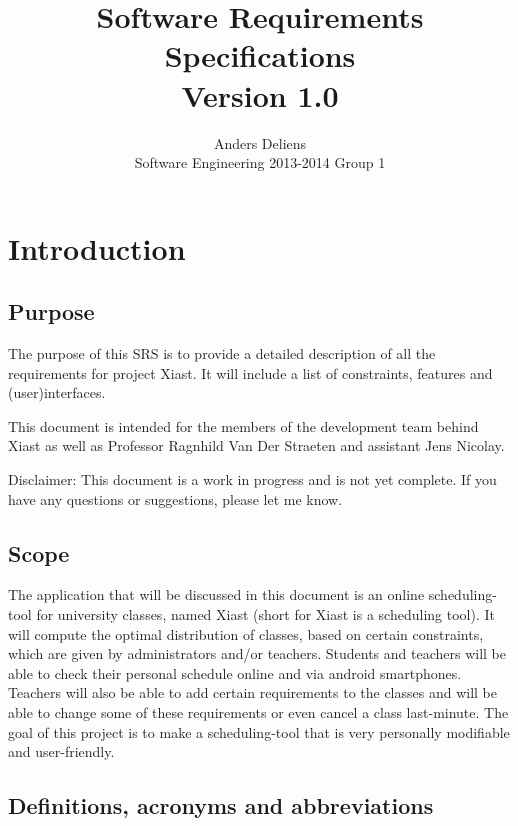 \documentclass[9pt]{article}
\title{Software Requirements Specifications\\Version 1.0}
\author{Anders Deliens\\Software Engineering 2013-2014 Group 1}
\begin{document}
\maketitle

\section{Introduction}\label{introduction}

\subsection{Purpose}\label{purpose}

The purpose of this SRS is to provide a detailed description of all the
requirements for project Xiast. It will include a list of constraints,
features and (user)interfaces.

This document is intended for the members of the development team behind
Xiast as well as Professor Ragnhild Van Der Straeten and assistant Jens
Nicolay.

Disclaimer: This document is a work in progress and is not yet complete.
If you have any questions or suggestions, please let me know.

\subsection{Scope}\label{scope}

The application that will be discussed in this document is an online
scheduling-tool for university classes, named Xiast (short for Xiast is
a scheduling tool). It will compute the optimal distribution of classes,
based on certain constraints, which are given by administrators and/or
teachers. Students and teachers will be able to check their personal
schedule online and via android smartphones. Teachers will also be able
to add certain requirements to the classes and will be able to change
some of these requirements or even cancel a class last-minute. The goal
of this project is to make a scheduling-tool that is very personally
modifiable and user-friendly.

\subsection{Definitions, acronyms and
abbreviations}\label{definitions-acronyms-and-abbreviations}
\end{document}
